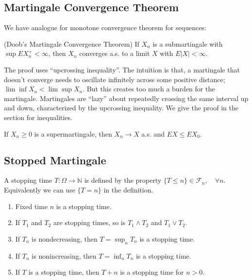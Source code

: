 \subsection{Martingale Convergence Theorem}

We have analogue for monotone convergence theorem for sequences:

\begin{theorem}
	(Doob's Martingale Convergence Theorem)
	\label{thm:DoobMartingaleConvergence}
	If $X_n$ is a submartingale with $\sup EX_n^+ < \infty $, then $X_n$ converges a.s. to a limit $X$ with $E|X| < \infty $.
\end{theorem}
The proof uses ``upcrossing inequality''. The intuition is that, a martingale that doesn't converge needs to oscillate infinitely across some positive distance; $\lim\inf X_n < \lim\sup X_n$. But this creates too much a burden for the martingale. Martingales are ``lazy'' about repeatedly crossing the same interval up and down, characterized by the upcrossing inequality.
We give the proof in the section for inequalities.

\begin{corollary}
	If $X_n \ge 0$ is a supermartingale, then $X_n \to  X$ a.s. and $EX \le  E X_0$.
\end{corollary}




\subsection{Stopped Martingale}

\begin{definition}
	A stopping time $T: \Omega \to \mathbb{N}$ is defined by the property
	$\{T \le n\} \in \mathcal{F}_n, \quad \forall n$.
	Equivalently we can use $\{T = n\} $ in the definition.
\end{definition}

\begin{proposition}
	\begin{enumerate}
		\item 
	Fixed time $n$ is a stopping time.
\item If $T_1$ and $T_2$ are stopping times, so is $T_1 \wedge T_2$ and $T_1 \vee T_2$.
\item If $T_n$ is nondecreasing, then $T = \sup _n T_n$ is a stopping time.
\item If $T_n$ is nonincreasing, then $T = \inf _n T_n$ is a stopping time.
\item If $T$ is a stopping time, then $T + n$ is a stopping time for $n > 0$.
	\end{enumerate}
\end{proposition}

